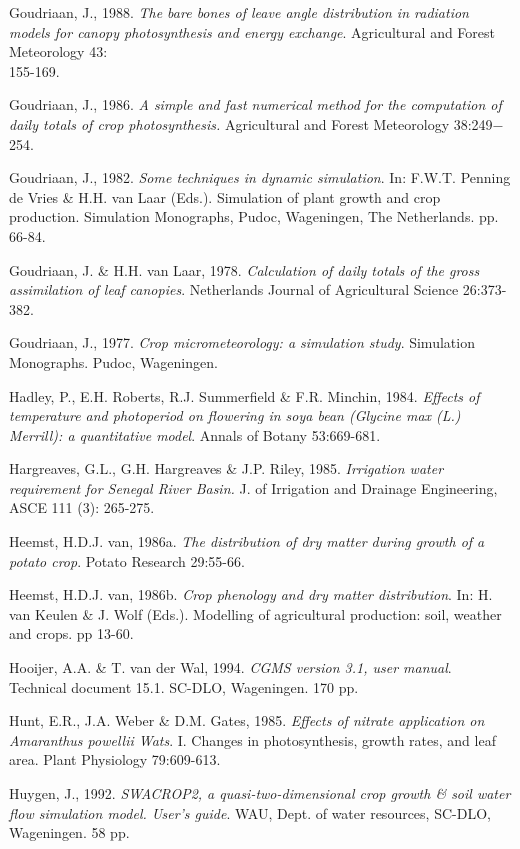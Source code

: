 Goudriaan, J., 1988. {\it The bare bones of leave angle distribution in radiation models for
canopy photosynthesis and energy exchange\/}. Agricultural and Forest Meteorology 43:\\
155-169.

Goudriaan, J., 1986. {\it A simple and fast numerical method for the computation of daily totals
of crop photosynthesis.\/} Agricultural and Forest Meteorology 38:249$-$254. 

Goudriaan, J., 1982. {\it Some techniques in dynamic simulation\/}. In:  F.W.T. Penning de Vries
\& H.H. van Laar (Eds.). Simulation of plant growth and crop production. Simulation
Monographs, Pudoc, Wageningen, The Netherlands. pp. 66-84.

Goudriaan, J. \& H.H. van Laar, 1978. {\it Calculation of daily totals of the gross assimilation
of leaf canopies\/}. Netherlands Journal of Agricultural Science 26:373-382.

\bigskip
Goudriaan, J., 1977. {\it Crop micrometeorology: a simulation study\/}. Simulation Monographs.
Pudoc, Wageningen.

Hadley, P., E.H. Roberts, R.J. Summerfield \& F.R. Minchin, 1984. {\it Effects of temperature
and photoperiod on flowering in soya bean (Glycine max (L.) Merrill): a quantitative model\/}.
Annals of Botany 53:669-681.

Hargreaves, G.L., G.H. Hargreaves \& J.P. Riley, 1985. {\it Irrigation water requirement for
Senegal River Basin.\/} J. of Irrigation and Drainage Engineer\-ing, ASCE 111 (3): 265-275.

Heemst, H.D.J. van, 1986a. {\it The distribution of dry matter during growth of a potato crop\/}. Potato
Research 29:55-66. 

Heemst, H.D.J. van, 1986b. {\it Crop phenology and dry matter distribution\/}. In:  H. van Keulen \& J.
Wolf (Eds.). Modelling of agricultural production: soil, weather and crops. pp 13-60.

Hooijer, A.A. \& T. van der Wal, 1994. {\it CGMS version 3.1, user manual\/}. Technical document 15.1.
SC-DLO, Wageningen. 170 pp.

Hunt, E.R., J.A. Weber \& D.M. Gates, 1985. {\it Effects of nitrate application on Amaranthus powellii
Wats\/}. I. Changes in photosynthesis, growth rates, and leaf area. Plant Physiology 79:609-613.

Huygen, J., 1992. {\it SWACROP2, a quasi-two-dimensional crop growth \& soil water flow simulation
model. User's guide\/}. WAU, Dept. of water resources, SC-DLO, Wageningen. 58 pp.

